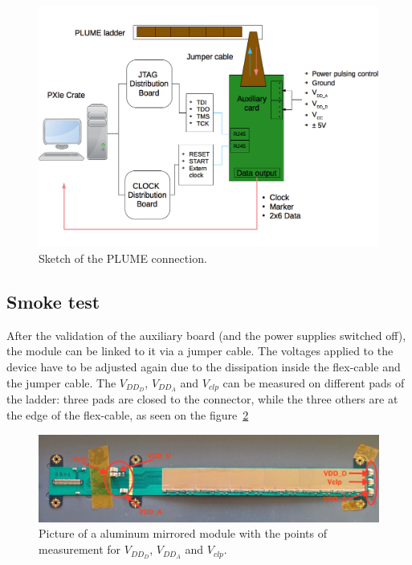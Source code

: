   \begin{figure}[!h]
    \centering
    \includegraphics[width=\textwidth]{Pictures/labTests/plumeAux.png}
    \caption{Sketch of the PLUME connection.}
    \label{fig:plumeAux}
  \end{figure}

  \subsection{Smoke test}

  After the validation of the auxiliary board (and the power supplies switched off), the module can be linked to it via a jumper cable.
  The voltages applied to the device have to be adjusted again due to the dissipation inside the flex-cable and the jumper cable.
  The $V_{DD_D}$, $V_{DD_A}$ and $V_{clp}$ can be measured on different pads of the ladder: three pads are closed to the connector, while the three others are at the edge of the flex-cable, as seen on the figure~\ref{fig:voltagePads}

  \begin{figure}[!h]
    \centering
    \includegraphics[width=\textwidth]{Pictures/labTests/AM01_voltagePads.jpg}
    \caption{Picture of a aluminum mirrored module with the points of measurement for $V_{DD_D}$, $V_{DD_A}$ and $V_{clp}$.}
    \label{fig:voltagePads}
  \end{figure}

